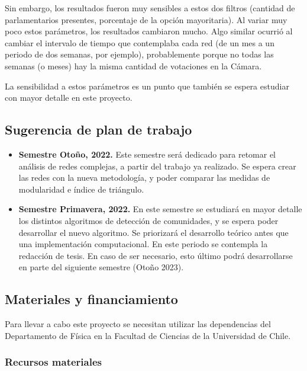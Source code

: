 \documentclass[hyperref]{proyectotesis}
\begin{document}
Sin embargo, los resultados fueron muy sensibles a estos dos filtros (cantidad de parlamentarios presentes, porcentaje de la opción mayoritaria). Al variar muy poco estos parámetros, los resultados cambiaron mucho. Algo similar ocurrió al cambiar el intervalo de tiempo que contemplaba cada red (de un mes a un periodo de dos semanas, por ejemplo), probablemente porque no todas las semanas (o meses) hay la misma cantidad de votaciones en la Cámara. 

La sensibilidad a estos parámetros es un punto que también se espera estudiar con mayor detalle en este proyecto. 



\subsection{Sugerencia de plan de trabajo}
\begin{itemize}
\item \textbf{Semestre Otoño, 2022.} Este semestre será dedicado para retomar el análisis de redes complejas, a partir del trabajo ya realizado. Se espera crear las redes con la nueva metodología, y poder comparar las medidas de modularidad e índice de triángulo.

\item \textbf{Semestre Primavera, 2022.} En este semestre se estudiará en mayor detalle los distintos algoritmos de detección de comunidades, y se espera poder desarrollar el nuevo algoritmo. Se priorizará el desarrollo teórico antes que una implementación computacional.
En este periodo se contempla la redacción de tesis. En caso de ser necesario, esto último podrá desarrollarse en parte del siguiente semestre (Otoño 2023). 
\end{itemize}

\subsection{Materiales y financiamiento}

Para llevar a cabo este proyecto se necesitan utilizar las dependencias del Departamento de Física en la Facultad de Ciencias de la Universidad de Chile. %

\subsubsection*{Recursos materiales}
\end{document}
